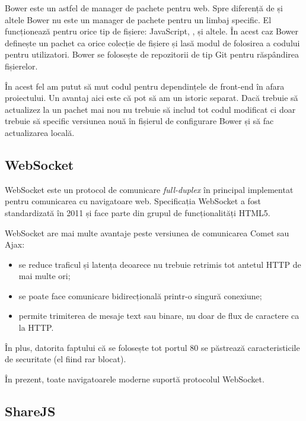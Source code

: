 \documentclass[a4wide,12pt]{report}
\newcommand{\eng}[1]{\emph{#1}} %
\newcommand{\acr}[1]{{\textsmaller[1]{\textsc{#1}}}} %
\begin{document}
Bower este un astfel de manager de pachete pentru web. Spre diferență de
\acr{NPM} și altele Bower nu este un manager de pachete pentru un limbaj
specific. El funcționează pentru orice tip de fișiere: JavaScript, \acr{HTML},
\acr{CSS} și altele. În acest caz Bower definește un pachet ca orice colecție de
fișiere și lasă modul de folosirea a codului pentru utilizatori. Bower se
folosește de repozitorii de tip Git pentru răspândirea fișierelor.

În acest fel am putut să mut codul pentru dependințele de front-end în afara
proiectului. Un avantaj aici este că pot să am un istoric separat. Dacă trebuie
să actualizez la un pachet mai nou nu trebuie să includ tot codul modificat ci
doar trebuie să specific versiunea nouă în fișierul de configurare Bower și să
fac actualizarea locală.

\subsection{WebSocket}
\label{websocketsub}

WebSocket este un protocol de comunicare \eng{full-duplex} în principal
implementat pentru comunicarea cu navigatoare web. Specificația WebSocket a fost
standardizată în 2011 și face parte din grupul de funcționalități HTML5.

WebSocket are mai multe avantaje peste versiunea de comunicarea Comet sau Ajax:

\begin{itemize}

\item se reduce traficul și latența deoarece nu trebuie retrimis tot antetul
HTTP de mai multe ori;

\item se poate face comunicare bidirecțională printr-o singură conexiune;

\item permite trimiterea de mesaje text sau binare, nu doar de flux de caractere
ca la HTTP.

\end{itemize}

În plus, datorita faptului că se folosește tot portul 80 se păstrează
caracteristicile de securitate (el fiind rar blocat).

În prezent, toate navigatoarele moderne suportă protocolul WebSocket.

\subsection{ShareJS}
\label{sharejssub}
\end{document}
